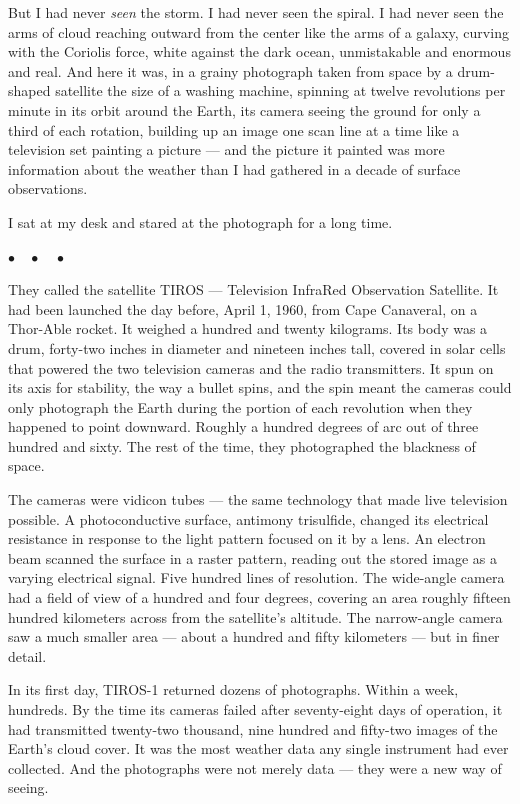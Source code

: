 \documentclass[12pt, letterpaper]{article}
\begin{document}
But I had never \emph{seen} the storm. I had never seen the spiral. I had never seen the arms of cloud reaching outward from the center like the arms of a galaxy, curving with the Coriolis force, white against the dark ocean, unmistakable and enormous and real. And here it was, in a grainy photograph taken from space by a drum-shaped satellite the size of a washing machine, spinning at twelve revolutions per minute in its orbit around the Earth, its camera seeing the ground for only a third of each rotation, building up an image one scan line at a time like a television set painting a picture --- and the picture it painted was more information about the weather than I had gathered in a decade of surface observations.

I sat at my desk and stared at the photograph for a long time.

\begin{center}
$\bullet\quad\bullet\quad\bullet$
\end{center}

They called the satellite TIROS --- Television InfraRed Observation Satellite. It had been launched the day before, April 1, 1960, from Cape Canaveral, on a Thor-Able rocket. It weighed a hundred and twenty kilograms. Its body was a drum, forty-two inches in diameter and nineteen inches tall, covered in solar cells that powered the two television cameras and the radio transmitters. It spun on its axis for stability, the way a bullet spins, and the spin meant the cameras could only photograph the Earth during the portion of each revolution when they happened to point downward. Roughly a hundred degrees of arc out of three hundred and sixty. The rest of the time, they photographed the blackness of space.

The cameras were vidicon tubes --- the same technology that made live television possible. A photoconductive surface, antimony trisulfide, changed its electrical resistance in response to the light pattern focused on it by a lens. An electron beam scanned the surface in a raster pattern, reading out the stored image as a varying electrical signal. Five hundred lines of resolution. The wide-angle camera had a field of view of a hundred and four degrees, covering an area roughly fifteen hundred kilometers across from the satellite's altitude. The narrow-angle camera saw a much smaller area --- about a hundred and fifty kilometers --- but in finer detail.

In its first day, TIROS-1 returned dozens of photographs. Within a week, hundreds. By the time its cameras failed after seventy-eight days of operation, it had transmitted twenty-two thousand, nine hundred and fifty-two images of the Earth's cloud cover. It was the most weather data any single instrument had ever collected. And the photographs were not merely data --- they were a new way of seeing.
\end{document}
